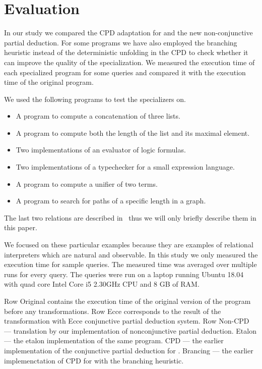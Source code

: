 \section{Evaluation}
In our study we compared the CPD adaptation for \mk{} and the new non-conjunctive partial deduction.
For some programs we have also employed the branching heuristic instead of the deterministic unfolding in the CPD to check whether it can improve the quality of the specialization.
We measured the execution time of each specialized program for some queries and compared it with the execution time of the original program.

We used the following programs to test the specializers on.
\begin{itemize}
  \item A program to compute a concatenation of three lists.
  \item A program to compute both the length of the list and its maximal element.
  \item Two implementations of an evaluator of logic formulas.
  \item Two implementations of a typechecker for a small expression language.
  \item A program to compute a unifier of two terms.
  \item A program to search for paths of a specific length in a graph.
\end{itemize}

The last two relations are described in~\cite{lozov2019relational} thus we will only briefly describe them in this paper.

We focused on these particular examples because they are examples of relational interpreters which are natural and observable.
In this study we only measured the execution time for sample queries.
The measured time was averaged over multiple runs for every query.
The queries were run on a laptop running Ubuntu 18.04 with quad core Intel Core i5 2.30GHz CPU and 8 GB of RAM.

Row Original contains the execution time of the original version of the program before any transformations.
Row Ecce corresponds to the result of the transformation with Ecce conjunctive partial deduction system.
Row Non-CPD --- translation by our implementation of nonconjunctive partial deduction.
Etalon --- the etalon implementation of the same program.
CPD --- the earlier implementation of the conjunctive partial deduction for \mk{}.
Brancing --- the earlier implemenctation of CPD for \mk{} with the branching heuristic.

